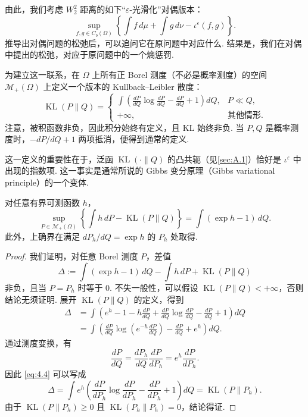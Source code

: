 由此，我们考虑 $W_2^2$ 距离的如下“$\varepsilon$-光滑化”对偶版本：
\begin{equation}\tag{$\varepsilon$-D-$W_2^2$}\label{eq:eps-D-W22}
\sup_{f,g\in C_b(\Omega)}\left\{\int f\,d\mu+\int g\,d\nu-\iota^\varepsilon(f,g)\right\}.
\end{equation}
推导出对偶问题的松弛后，可以追问它在原问题中对应什么. 结果是，我们在对偶中提出的松弛，对应于原问题中的一个熵惩罚.

为建立这一联系，在 $\Omega$ 上所有正 Borel 测度（不必是概率测度）的空间 $\mathcal M_+(\Omega)$ 上定义一个版本的 Kullback--Leibler 散度：
$$\operatorname{KL}(P\|Q)=\begin{cases}
\displaystyle\int\left(\frac{dP}{dQ}\log\frac{dP}{dQ}-\frac{dP}{dQ}+1\right)dQ,&P\ll Q,\\
+\infty,&\text{其他情形.}\end{cases}$$
注意，被积函数非负，因此积分始终有定义，且 KL 始终非负. 当 $P,Q$ 是概率测度时，$-dP/dQ+1$ 两项抵消，便得到通常的定义.

这一定义的重要性在于，泛函 $\operatorname{KL}(\cdot\|Q)$ 的凸共轭（见\autoref{sec:A.1}）恰好是 $\iota^\varepsilon$ 中出现的指数项. 这一事实是通常所说的 Gibbs 变分原理（Gibbs variational principle）的一个变体.
\begin{proposition}\label{prop:4.2}
对任意有界可测函数 $h$，
$$\sup_{P\in\mathcal M_+(\Omega)}\left\{\int h\,dP-\operatorname{KL}(P\|Q)\right\}
=\int(\exp h-1)\,dQ.$$
此外，上确界在满足 $dP_h/dQ=\exp h$ 的 $P_h$ 处取得.
\end{proposition}
\begin{proof}
我们证明，对任意 Borel 测度 $P$，差值
$$\Delta:=\int(\exp h-1)\,dQ-\int h\,dP+\operatorname{KL}(P\|Q)$$
非负，且当 $P=P_h$ 时等于 0. 不失一般性，可以假设 $\operatorname{KL}(P\|Q)<+\infty$，否则结论无须证明. 展开 $\operatorname{KL}(P\|Q)$ 的定义，得到
\begin{equation}\label{eq:4.4}
\begin{aligned}
\Delta&=\int\left(e^h-1-h\frac{dP}{dQ}+\frac{dP}{dQ}\log\frac{dP}{dQ}-\frac{dP}{dQ}+1\right)dQ\\
&=\int\left(\frac{dP}{dQ}\log\left(e^{-h}\frac{dP}{dQ}\right)-\frac{dP}{dQ}+e^h\right)dQ.
\end{aligned}
\end{equation}
通过测度变换，有
$$\frac{dP}{dQ}=\frac{dP_h}{dQ}\frac{dP}{dP_h}=e^h\frac{dP}{dP_h}.$$
因此 \eqref{eq:4.4} 可以写成
$$\Delta=\int e^h\left(\frac{dP}{dP_h}\log\frac{dP}{dP_h}-\frac{dP}{dP_h}+1\right)dQ
=\operatorname{KL}(P\|P_h).$$
由于 $\operatorname{KL}(P\|P_h)\ge0$ 且 $\operatorname{KL}(P_h\|P_h)=0$，结论得证.
\end{proof}

